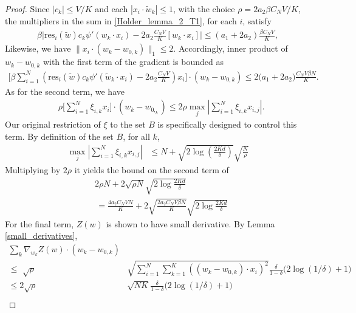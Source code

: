 \documentclass{article}
\numberwithin{equation}{section}
\theoremstyle{Lemma}
\theoremstyle{Corollary}
\theoremstyle{Theorem}
\theoremstyle{Remark}
\begin{document}
\begin{proof}
Since $|c_k| \le V/K$ and each $|x_i \cdot \tilde{w}_k|\le 1$, with the choice $\rho = 2a_2 \beta C_N V/K$, the multipliers in the sum in \eqref{Holder_lemma_2_T1}, for each $i$, satisfy 
\begin{align}
    \beta \big|\text{res}_{i}(\tilde{w})c_{k}\psi'(w_{k}\cdot x_{i}) -2a_{2}\frac{ C_{N} V}{K}[w_{k}\cdot x_{i}]\big|\leq(a_{1}+2a_{2})\frac{\beta C_{N}V}{K},
\end{align} 
Likewise, we have  $\|x_i \cdot (w_{k}-w_{0,k})\|_{1} \leq 2$. Accordingly, inner product of $w_k -w_{0,k}$ with the first term of the gradient is bounded as
\begin{align}
    \Big[ \beta \sum_{i=1}^{N}(\text{res}_{i}(\tilde{w})c_{k}\psi'(\tilde w_{k}\cdot x_{i}) -2a_2 \frac{C_{N}V}{K})x_{i}\Big]\cdot (w_{k}-w_{0,k})\leq 2\Big(a_{1}+2a_{2}\Big)\frac{C_{N}V \beta N}{K}\label{holder_part2_t1}.
\end{align}
As for the second term, we have 
\begin{align}
    &\rho \Big[\sum_{i=1}^{N}\xi_{i,k}x_{i} \Big]\cdot(w_{k}-w_{0,_{k}}) \leq 2\rho \max_{j} |\sum_{i=1}^{N}\xi_{i,k}x_{i,j}|.
\end{align}
Our original restriction of $\xi$ to the set $B$ is specifically designed to control this term. By definition of the set $B$, for all $k$,
\begin{align}
    \max_{j}|\sum_{i=1}^{N}\xi_{i,k}x_{i,j}| &\leq  N + \sqrt{2 \log (\frac{2Kd}{\delta})}\sqrt{\frac{N}{\rho}}
\end{align}
Multiplying by $2\rho$ it yields the bound on the second term of 
\begin{align}
&2\rho N + 2 \sqrt{\rho N} \sqrt{2 \log \frac{2Kd}{\delta}} \\
&\, = \frac {4a_2 C_N V N}{K} + 2\sqrt{\frac{2a_2 C_N V\beta N}{K}} \sqrt{2 \log \frac{2Kd}{\delta}} \label{holder_part2_t2} 
\end{align}
For the final term, $Z(w)$ is shown to have small derivative. By Lemma \ref{small_derivatives},
\begin{align}
\sum_{k} \nabla_{w_{k}}  Z(w) \cdot (w_{k}-w_{0,k})&\\
\leq \,\, \sqrt{\rho}&\sqrt{\sum_{i=1}^{N}\sum_{k=1}^{K}((w_{k}-w_{0,k})\cdot x_{i})^{2}}\frac{\delta}{1-\delta}\big(2\log(1/\delta)+1\big)\\
\le  2 \sqrt{\rho} & \sqrt{NK} \frac{\delta}{1-\delta}\big(2\log(1/\delta)+1\big)\\

\end{align}
\end{proof}
\end{document}
